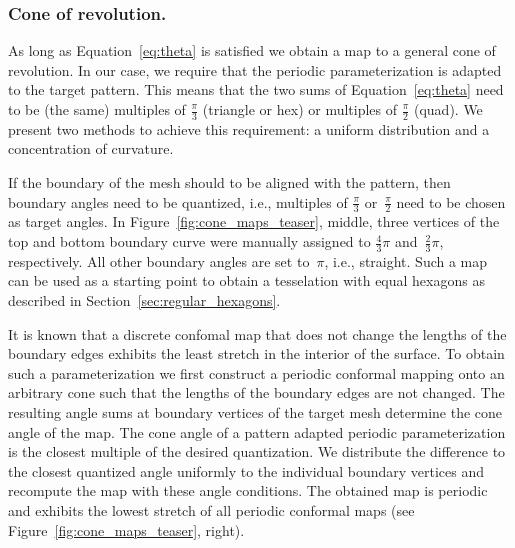 \documentclass[article.tex]{subfiles}
\begin{document}
\subsubsection{Cone of revolution.}
As long as Equation~\eqref{eq:theta} is satisfied we obtain a map to a
general cone of revolution. In our case, we require that the
periodic parameterization is adapted to the target pattern. 
This means that the two sums of Equation~\eqref{eq:theta} need to 
be (the same) multiples of
$\tfrac{\pi}{3}$ (triangle or hex) or multiples of $\tfrac{\pi}{2}$
(quad). We present two methods to achieve this requirement: a uniform
distribution and a concentration of curvature.

If the boundary of the mesh should to be aligned with the pattern,
then boundary angles need to be quantized, i.e., multiples of
$\tfrac{\pi}{3}$ or~$\tfrac{\pi}{2}$ need to be chosen as target
angles. In Figure~\ref{fig:cone_maps_teaser}, middle, three vertices
of the top and bottom boundary curve were manually assigned to
$\tfrac{4}{3}\pi$ and~$\tfrac{2}{3}\pi$, respectively. All other
boundary angles are set to~$\pi$, i.e., straight.  Such a map can
be used as a starting point to obtain a tesselation with equal
hexagons as described in Section~\ref{sec:regular_hexagons}.

It is known that a discrete confomal map that does not change the lengths of the 
boundary edges exhibits the least stretch in the interior of the surface.
To obtain such a parameterization we first construct a periodic conformal 
mapping onto an
arbitrary cone such that the lengths of the boundary edges are not
changed. The resulting angle sums at boundary vertices of the
target mesh determine the cone angle of the map. The cone angle of
a pattern adapted periodic parameterization is the closest multiple of the 
desired quantization. We distribute the difference to the closest
quantized angle uniformly to the individual boundary vertices and
recompute the map with these angle conditions. The obtained map is 
periodic and exhibits the lowest stretch of all periodic conformal maps (see
Figure~\ref{fig:cone_maps_teaser}, right).  
\end{document}
